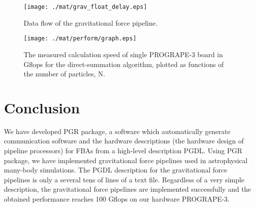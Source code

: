 \documentclass{llncs}
\begin{document}
\begin{figure}[htb]
  \begin{center}
    \begin{minipage}{.45\linewidth}
\begin{center}
\texttt{[image: ./mat/grav\_float\_delay.eps]}
\caption{Data flow of the gravitational force pipeline.}
\label{fig_grav_float_delay}
\end{center}
    \end{minipage}
    \hspace{2.3pc}
    \begin{minipage}{.45\linewidth}
  \begin{center}
    \texttt{[image: ./mat/perform/graph.eps]}
    \caption{The measured calculation speed of single PROGRAPE-3 board in Gflops for the direct-summation algorithm, plotted as functions of the number of particles, N.}
    \label{MESURE-PERFORM}
  \end{center}
    \end{minipage}
  \end{center}
\end{figure}





\section{Conclusion}
We have developed PGR package, a software which automatically
generate communication software and the hardware descriptions (the
hardware design of pipeline processors) for FBAs from a high-level
description PGDL.  Using PGR package, we have implemented
gravitational force pipelines used in astrophysical many-body simulations. 
The PGDL description for the gravitational force pipelines is only a
several tens of lines of a text file.  Regardless of a very simple
description, the gravitational force pipelines are implemented successfully and
the obtained performance reaches 100 Gflops on our hardware PROGRAPE-3.
\end{document}
